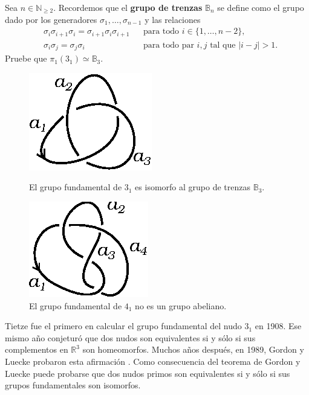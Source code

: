 \documentclass[graybox]{svmult}
\newcommand{\N}{\mathbb{N}}
\newcommand{\B}{\mathbb{B}}
\newcommand{\R}{\mathbb{R}}
\begin{document}
\begin{exercise}
    Sea $n\in\N_{\geq2}$. Recordemos que el \textbf{grupo de trenzas} $\B_n$ se
    define como el grupo dado por los generadores $\sigma_1,\dots,\sigma_{n-1}$
    y las relaciones 
    \begin{align*}
        &\sigma_i\sigma_{i+1}\sigma_i=\sigma_{i+1}\sigma_i\sigma_{i+1} && \text{para todo $i\in\{1,\dots,n-2\}$},\\
        &\sigma_i\sigma_j=\sigma_j\sigma_i && \text{para todo par $i,j$ tal que $|i-j|>1$}.
    \end{align*}
    Pruebe que $\pi_1(3_1)\simeq\B_3$. 
\end{exercise}

\begin{figure}[ht]
	\centering
	\begin{minipage}{0.4\textwidth}
		\centering
		\includegraphics[scale=0.6]{images/3_1}
		\caption{El grupo fundamental de $3_1$ es isomorfo al grupo de trenzas $\B_3$.}
		\label{fig:oriented:3_1}
	\end{minipage}
	\begin{minipage}{0.4\textwidth}
		\centering
		\includegraphics[scale=0.6]{images/4_1}
		\caption{El grupo fundamental de $4_1$ no es un grupo abeliano.}
		\label{fig:4_1}
	\end{minipage}
\end{figure}



Tietze fue el primero en calcular el grupo fundamental del nudo $3_1$ en
1908. Ese mismo año conjeturó que dos nudos son equivalentes si y sólo si
sus complementos en $\R^3$ son homeomorfos. Muchos años después, en 1989,
Gordon y Luecke probaron esta afirmación \cite{MR965210}.  Como
consecuencia del teorema de Gordon y Luecke puede probarse que dos nudos
primos son equivalentes si y sólo si sus grupos fundamentales son
isomorfos. 
\end{document}
